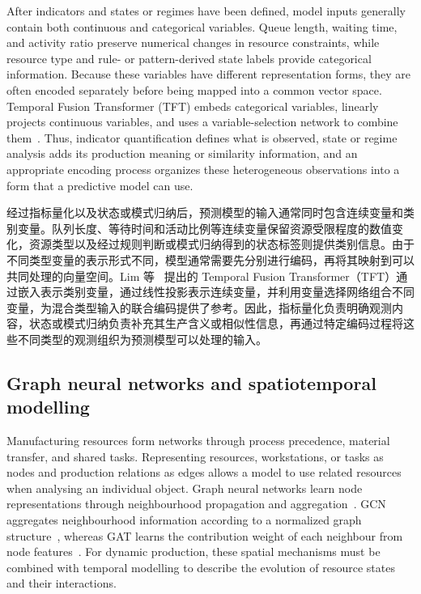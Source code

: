 \documentclass[a4paper,fleqn]{cas-dc}
\newcommand{\zhpara}[1]{%
  \par\begingroup\small\color{black!72}\noindent #1\par\endgroup}
\begin{document}
After indicators and states or regimes have been defined, model inputs generally contain both continuous and categorical variables. Queue length, waiting time, and activity ratio preserve numerical changes in resource constraints, while resource type and rule- or pattern-derived state labels provide categorical information. Because these variables have different representation forms, they are often encoded separately before being mapped into a common vector space. Temporal Fusion Transformer (TFT) embeds categorical variables, linearly projects continuous variables, and uses a variable-selection network to combine them~\cite{lim2021tft}. Thus, indicator quantification defines what is observed, state or regime analysis adds its production meaning or similarity information, and an appropriate encoding process organizes these heterogeneous observations into a form that a predictive model can use.

\zhpara{经过指标量化以及状态或模式归纳后，预测模型的输入通常同时包含连续变量和类别变量。队列长度、等待时间和活动比例等连续变量保留资源受限程度的数值变化，资源类型以及经过规则判断或模式归纳得到的状态标签则提供类别信息。由于不同类型变量的表示形式不同，模型通常需要先分别进行编码，再将其映射到可以共同处理的向量空间。Lim 等~\cite{lim2021tft} 提出的 Temporal Fusion Transformer（TFT）通过嵌入表示类别变量，通过线性投影表示连续变量，并利用变量选择网络组合不同变量，为混合类型输入的联合编码提供了参考。因此，指标量化负责明确观测内容，状态或模式归纳负责补充其生产含义或相似性信息，再通过特定编码过程将这些不同类型的观测组织为预测模型可以处理的输入。}

\subsection{Graph neural networks and spatiotemporal modelling}

Manufacturing resources form networks through process precedence, material transfer, and shared tasks. Representing resources, workstations, or tasks as nodes and production relations as edges allows a model to use related resources when analysing an individual object. Graph neural networks learn node representations through neighbourhood propagation and aggregation~\cite{wu2021gnn}. GCN aggregates neighbourhood information according to a normalized graph structure~\cite{kipf2017gcn}, whereas GAT learns the contribution weight of each neighbour from node features~\cite{velickovic2018gat}. For dynamic production, these spatial mechanisms must be combined with temporal modelling to describe the evolution of resource states and their interactions.
\end{document}
